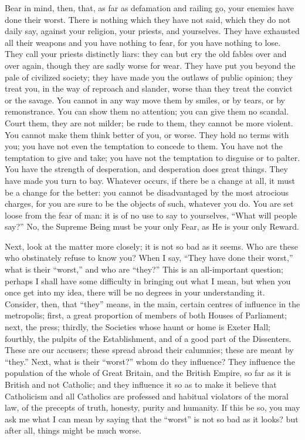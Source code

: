 Bear in mind, then, that, as far as defamation and
railing go, your enemies have done their worst. There is
nothing which they have not said, which they do not daily
say, against your religion, your priests, and yourselves.
They have exhausted all their weapons and you have
nothing to fear, for you have nothing to lose. They call
your priests distinctly liars: they can but cry the old
fables over and over again, though they are sadly worse
for wear. They have put you beyond the pale of civilized
society; they have made you the outlaws of public
opinion; they treat you, in the way of reproach and
slander, worse than they treat the convict or the savage.
You cannot in any way move them by smiles, or by tears,
or by remonstrance. You can show them no attention; you
can give them no scandal. Court them, they are not
milder; be rude to them, they cannot be more violent. You
cannot make them think better of you, or worse. They hold
no terms with you; you have not even the temptation to
concede to them. You have not the temptation to give and
take; you have not the temptation to disguise or to
palter. You have the strength of desperation, and
desperation does great things. They have made you turn to
bay. Whatever occurs, if there be a change at all, it
must be a change for the better: you cannot be
disadvantaged by the most atrocious charges, for you are
sure to be the objects of such, whatever you do. You are
set loose from the fear of man: it is of no use to say to
yourselves, ``What will people say?'' No, the
Supreme Being must be your only Fear, as He is your only
Reward.

Next, look at the matter more closely; it is not so
bad as it seems. Who are these who obstinately refuse to
know you? When I say, ``They have done their
worst,'' what is their ``worst,'' and who are
``they?'' This is an all-important question;
perhaps I shall have some difficulty in bringing out what
I mean, but when you once get into my idea, there will be
no degrees in your understanding it. Consider, then, that
``they'' means, in the main, certain centres of
influence in the metropolis; first, a great proportion of
members of both Houses of Parliament; next, the press;
thirdly, the Societies whose haunt or home is Exeter
Hall; fourthly, the pulpits of the Establishment, and of
a good part of the Dissenters. These are our accusers;
these spread abroad their calumnies; these are meant by
``they.'' Next, what is their ``worst?''
whom do they influence? They influence the population of
the whole of Great Britain, and the British Empire, so
far as it is British and not Catholic; and they influence
it so as to make it believe that Catholicism and all
Catholics are professed and habitual violators of the
moral law, of the precepts of truth, honesty, purity and
humanity. If this be so, you may ask me what I can mean
by saying that the ``worst'' is not so bad as it
looks? but after all, things might be much worse.

